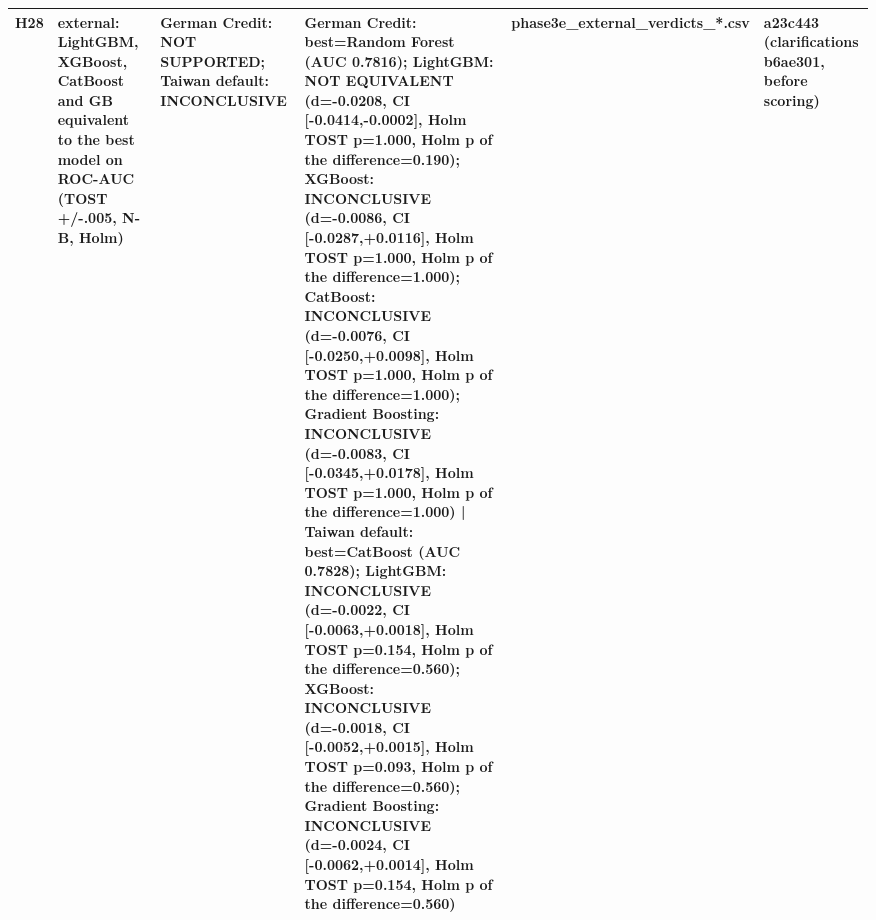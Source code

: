 \begin{table}[t]
\begin{tabular}{lp{5.2cm}p{5.2cm}p{5.2cm}lp{5.2cm}}
H28 & external: LightGBM, XGBoost, CatBoost and GB equivalent to the best model on ROC-AUC (TOST +/-.005, N-B, Holm) & German Credit: NOT SUPPORTED; Taiwan default: INCONCLUSIVE & German Credit: best=Random Forest (AUC 0.7816); LightGBM: NOT EQUIVALENT (d=-0.0208, CI [-0.0414,-0.0002], Holm TOST p=1.000, Holm p of the difference=0.190); XGBoost: INCONCLUSIVE (d=-0.0086, CI [-0.0287,+0.0116], Holm TOST p=1.000, Holm p of the difference=1.000); CatBoost: INCONCLUSIVE (d=-0.0076, CI [-0.0250,+0.0098], Holm TOST p=1.000, Holm p of the difference=1.000); Gradient Boosting: INCONCLUSIVE (d=-0.0083, CI [-0.0345,+0.0178], Holm TOST p=1.000, Holm p of the difference=1.000) | Taiwan default: best=CatBoost (AUC 0.7828); LightGBM: INCONCLUSIVE (d=-0.0022, CI [-0.0063,+0.0018], Holm TOST p=0.154, Holm p of the difference=0.560); XGBoost: INCONCLUSIVE (d=-0.0018, CI [-0.0052,+0.0015], Holm TOST p=0.093, Holm p of the difference=0.560); Gradient Boosting: INCONCLUSIVE (d=-0.0024, CI [-0.0062,+0.0014], Holm TOST p=0.154, Holm p of the difference=0.560) & phase3e\_external\_verdicts\_*.csv & a23c443 (clarifications b6ae301, before scoring) \\
\bottomrule
\end{tabular}
\end{table}
